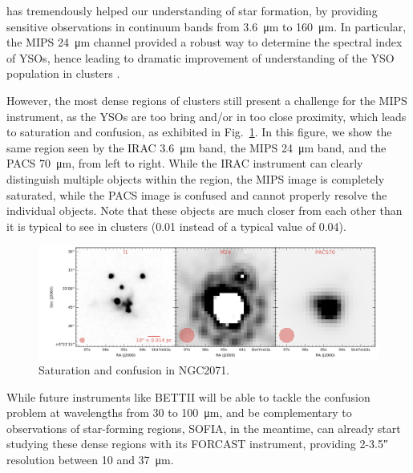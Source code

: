 \Spitzer has tremendously helped our understanding of star formation, by providing sensitive observations in continuum bands from \SI{3.6}{\um} to \SI{160}{\micro\meter}. In particular, the MIPS \SI{24}{\micro\meter} channel provided a robust way to determine the spectral index of YSOs, hence leading to dramatic improvement of understanding of the YSO population in clusters \citep[e.g.,][]{Gutermuth:2009gca,Gutermuth:2011he}.

However, the most dense regions of clusters still present a challenge for the MIPS instrument, as the YSOs are too bring and/or in too close proximity, which leads to saturation and confusion, as exhibited in Fig.~\ref{fig:NGC2071saturated}. In this figure, we show the same region seen by the IRAC \SI{3.6}{\um} band, the MIPS \SI{24}{\um} band, and the \Herschel PACS \SI{70}{\um}, from left to right. While the IRAC instrument can clearly distinguish multiple objects within the region, the MIPS image is completely saturated, while the PACS image is confused and cannot properly resolve the individual objects. Note that these objects are much closer from each other than it is typical to see in clusters (\SI{0.01}{\pc} instead of a typical value of \SI{0.04}{\pc}). 

\begin{figure}[!h]
\begin{center}
\includegraphics[width=\textwidth]{Figures/NGC2071_saturated_mosaic.png}
\vspace{-0.5cm}
\caption[Saturation and confusion]{Saturation and confusion in NGC2071.}
\label{fig:NGC2071saturated}
\end{center}
\end{figure}

While future instruments like BETTII will be able to tackle the confusion problem at wavelengths from 30 to \SI{100}{\micro\meter}, and be complementary to \Herschel observations of star-forming regions, SOFIA, in the meantime, can already start studying these dense regions with its FORCAST instrument, providing 2-\ang{;;3.5} resolution between 10 and \SI{37}{\micro\meter}. 

